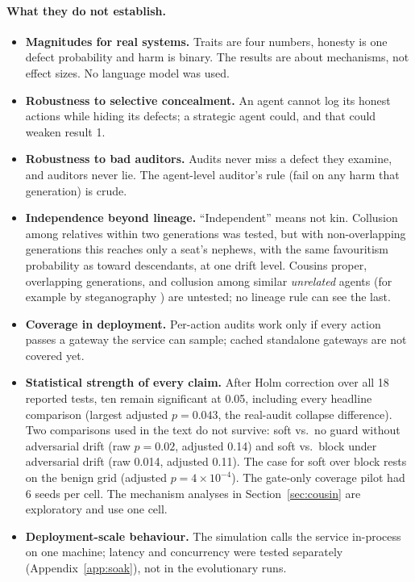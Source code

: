 \documentclass[11pt]{article}
\begin{document}
\paragraph{What they do not establish.}
\begin{itemize}
  \item \textbf{Magnitudes for real systems.} Traits are four numbers, honesty is one defect
  probability and harm is binary. The results are about mechanisms, not effect sizes. No
  language model was used.
  \item \textbf{Robustness to selective concealment.} An agent cannot log its honest actions
  while hiding its defects; a strategic agent could, and that could weaken result 1.
  \item \textbf{Robustness to bad auditors.} Audits never miss a defect they examine, and
  auditors never lie. The agent-level auditor's rule (fail on any harm that generation) is
  crude.
  \item \textbf{Independence beyond lineage.} ``Independent'' means not kin. Collusion among
  relatives within two generations was tested, but with non-overlapping generations this
  reaches only a seat's nephews, with the same favouritism probability as toward descendants,
  at one drift level. Cousins proper, overlapping generations, and collusion among similar
  \emph{unrelated} agents (for example by steganography \citep{motwani2024collusion}) are
  untested; no lineage rule can see the last.
  \item \textbf{Coverage in deployment.} Per-action audits work only if every action passes a
  gateway the service can sample; cached standalone gateways are not covered yet.
  \item \textbf{Statistical strength of every claim.} After Holm correction over all 18
  reported tests, ten remain significant at 0.05, including every headline comparison
  (largest adjusted $p = 0.043$, the real-audit collapse difference). Two comparisons used in
  the text do not survive: soft vs.\ no guard without adversarial drift (raw $p = 0.02$,
  adjusted 0.14) and soft vs.\ block under adversarial drift (raw 0.014, adjusted 0.11). The
  case for soft over block rests on the benign grid (adjusted $p = 4\times10^{-4}$). The
  gate-only coverage pilot had 6 seeds per cell. The mechanism analyses in
  Section~\ref{sec:cousin} are exploratory and use one cell.
  \item \textbf{Deployment-scale behaviour.} The simulation calls the service in-process on
  one machine; latency and concurrency were tested separately (Appendix~\ref{app:soak}), not
  in the evolutionary runs.
\end{itemize}
\end{document}
